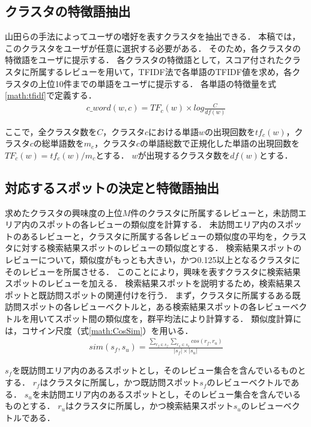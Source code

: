 \documentclass{deimj}
\begin{document}
\subsection{クラスタの特徴語抽出}
\label{sub:クラスタの特徴語抽出}
山田ら\cite{山田}の手法によってユーザの嗜好を表すクラスタを抽出できる．
本稿では，このクラスタをユーザが任意に選択する必要がある．
そのため，各クラスタの特徴語をユーザに提示する．
各クラスタの特徴語として，スコア付されたクラスタに所属するレビューを用いて，TFIDF法で各単語のTFIDF値を求め，各クラスタの上位10件までの単語をユーザに提示する．
各単語の特徴量を式\ref{math:tfidf}で定義する．
\begin{eqnarray}
c\_word(w,c) = TF_{c}(w) \times log\frac{C}{df(w)}
    \label{math:tfidf}
\end{eqnarray}

ここで，全クラスタ数を$C$，クラスタ$c$における単語$w$の出現回数を$tf_{c}(w)$，クラスタ$c$の総単語数を$m_c$，クラスタ$c$の単語総数で正規化した単語の出現回数を$TF_c(w)=tf_c(w)/m_c$とする．
$w$が出現するクラスタ数を$df(w)$とする．
\subsection{対応するスポットの決定と特徴語抽出}
求めたクラスタの興味度の上位$M$件のクラスタに所属するレビューと，未訪問エリア内のスポットの各レビューの類似度を計算する．
未訪問エリア内のスポットのあるレビューと，クラスタに所属する各レビューの類似度の平均を，クラスタに対する検索結果スポットのレビューの類似度とする．
検索結果スポットのレビューについて，類似度がもっとも大きい，かつ0.125以上となるクラスタにそのレビューを所属させる．
このことにより，興味を表すクラスタに検索結果スポットのレビューを加える．
検索結果スポットを説明するため，検索結果スポットと既訪問スポットの関連付けを行う．
まず，クラスタに所属するある既訪問スポットの各レビューベクトルと，ある検索結果スポットの各レビューベクトルを用いてスポット間の類似度を，群平均法により計算する．
類似度計算には，コサイン尺度（式\ref{math:CosSim}）を用いる．
\begin{eqnarray}
  sim(s_f,s_u)=\frac{\sum_{r_f \in s_f} \sum_{r_u \in s_u} cos(r_f,r_u)}{|s_f| \times |s_u|}
  \label{math:CosSim}
\end{eqnarray}

$s_f$を既訪問エリア内のあるスポットとし，そのレビュー集合を含んでいるものとする．
$r_f$はクラスタに所属し，かつ既訪問スポット$s_f$のレビューベクトルである．
$s_u$を未訪問エリア内のあるスポットとし，そのレビュー集合を含んでいるものとする．
$r_u$はクラスタに所属し，かつ検索結果スポット$s_u$のレビューベクトルである．
\end{document}
